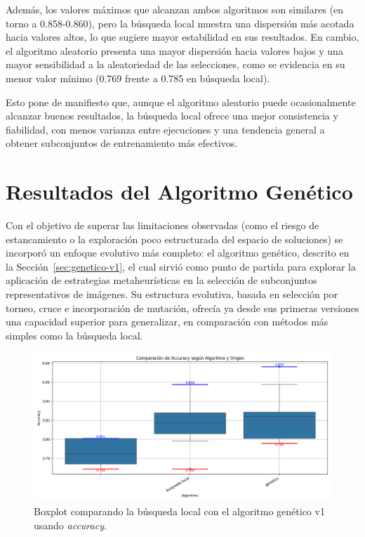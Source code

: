 Además, los valores máximos que alcanzan ambos algoritmos son similares (en torno a 0.858-0.860),
pero la búsqueda local muestra una dispersión más acotada hacia valores altos, lo que sugiere mayor estabilidad en sus resultados.
En cambio, el algoritmo aleatorio presenta una mayor dispersión hacia valores bajos y una mayor sensibilidad a la aleatoriedad de las selecciones,
como se evidencia en su menor valor mínimo (0.769 frente a 0.785 en búsqueda local).

Esto pone de manifiesto que, aunque el algoritmo aleatorio puede ocasionalmente alcanzar buenos resultados,
la búsqueda local ofrece una mejor consistencia y fiabilidad, con menos varianza entre ejecuciones y una tendencia general a obtener subconjuntos de entrenamiento más efectivos.


\section{Resultados del Algoritmo Genético}\label{sec:resultados-algoritmo-genetico}
Con el objetivo de superar las limitaciones observadas (como el riesgo de estancamiento o la exploración poco estructurada del espacio de soluciones)
se incorporó un enfoque evolutivo más completo: el algoritmo genético, descrito en la Sección~\ref{sec:genetico-v1}, el cual sirvió como punto de partida para explorar la
aplicación de estrategias metaheurísticas en la selección de subconjuntos representativos de imágenes.
Su estructura evolutiva, basada en selección por torneo, cruce e incorporación de mutación,
ofrecía ya desde sus primeras versiones una capacidad superior para generalizar, en comparación con métodos más simples como la búsqueda local.

\begin{figure}[htp]
    \centering
    \includegraphics[width=1\textwidth]{imagenes/evaluaciones/comparacion_bl-gen_v1}
    \caption{Boxplot comparando la búsqueda local con el algoritmo genético v1 usando \textit{accuracy}.}
    \label{fig:bl-vs-gen-v1}
\end{figure}

